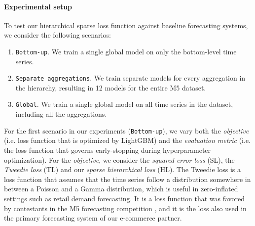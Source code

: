 \documentclass[preprint, 3p, times, twocolumn]{elsarticle}
\begin{document}
  \paragraph{Experimental setup} To test our hierarchical sparse loss function against baseline forecasting systems, we consider the following scenarios:
  \begin{enumerate}
    \item \texttt{Bottom-up}. We train a single global model on only the bottom-level time series.
    \item \texttt{Separate aggregations}. We train separate models for every aggregation in the hierarchy, resulting in 12 models for the entire M5 dataset.
    \item \texttt{Global}. We train a single global model on all time series in the dataset, including all the aggregations.
  \end{enumerate}
  For the first scenario in our experiments (\texttt{Bottom-up}), we vary both the \textit{objective} (i.e. loss function that is optimized by LightGBM) and the \textit{evaluation metric} (i.e. the loss function that governs early-stopping during hyperparameter optimization). For the \textit{objective}, we consider the \textit{squared error loss} (SL), the \textit{Tweedie loss} (TL) and our \textit{sparse hierarchical loss} (HL). The Tweedie loss is a loss function that assumes that the time series follow a distribution somewhere in between a Poisson and a Gamma distribution, which is useful in zero-inflated settings such as retail demand forecasting. It is a loss function that was favored by contestants in the M5 forecasting competition \cite{januschowski_forecasting_2022}, and it is the loss also used in the primary forecasting system of our e-commerce partner.
\end{document}
